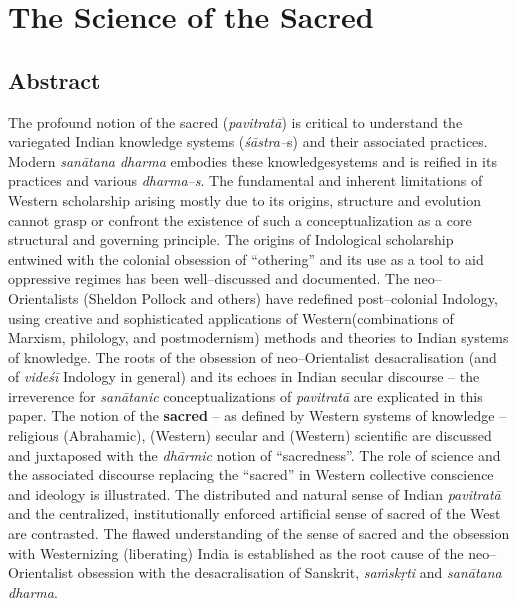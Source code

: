 
\chapter{The Science of the Sacred}\label{chapter9}



\section*{Abstract}

The profound notion of the sacred (\textit{pavitratā}) is critical to understand the variegated Indian knowledge systems (\textit{śāstra–}s) and their associated practices. Modern \textit{sanātana dharma } embodies these knowledge\break systems and is reified in its practices and various \textit{dharma–s}. The fundamental and inherent limitations of Western scholarship arising mostly due to its origins, structure and evolution cannot grasp or confront the existence of such a conceptualization as a core structural and governing principle. The origins of Indological scholarship entwined with the colonial obsession of “othering” and its use as a tool to aid oppressive regimes has been well–discussed and documented. The neo–Orientalists (Sheldon Pollock and others) have redefined post–colonial Indology, using creative and sophisticated applications of Western\break (combinations of Marxism, philology, and postmodernism) methods and theories to Indian systems of knowledge. The roots of the obsession of neo–Orientalist desacralisation (and of \textit{videśī} Indology in general) and its echoes in Indian secular discourse – the irreverence for \textit{sanātanic} conceptualizations of \textit{pavitratā} are explicated in this paper. The notion of the \textbf{sacred} – as defined by Western systems of knowledge – religious (Abrahamic), (Western) secular and (Western) scientific are discussed and juxtaposed with the \textit{dhārmic} notion of “sacredness”. The role of science and the associated discourse replacing the “sacred” in Western collective conscience and ideology is illustrated. The distributed and natural sense of Indian \textit{pavitratā} and the centralized, institutionally enforced artificial sense of sacred of the West are contrasted. The flawed understanding of the sense of sacred and the obsession with Westernizing (liberating) India is established as the root cause of the neo–Orientalist obsession with the desacralisation of Sanskrit, \textit{saṁskṛti} and \textit{sanātana dharma}.


